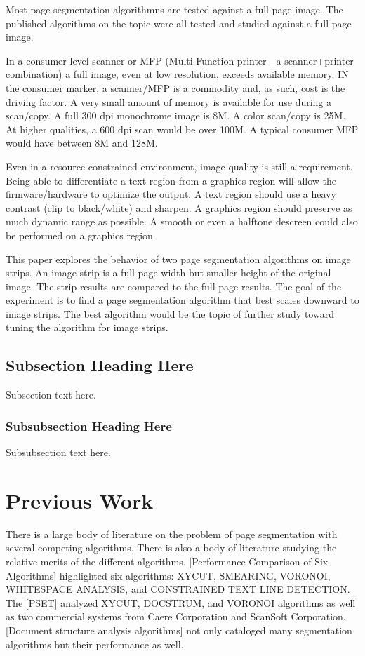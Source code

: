 \documentclass[conference]{IEEEtran}
\begin{document}
Most page segmentation algorithmns are tested against a full-page image. The
published algorithms on the topic were all tested and studied against a full-page
image.

In a consumer level scanner or MFP (Multi-Function printer—a scanner+printer
combination) a full image, even at low resolution, exceeds available
memory. IN the consumer marker, a scanner/MFP is a commodity and, as such, cost
is the driving factor. A very small amount of memory is available for use
during a scan/copy. A full 300 dpi monochrome image is 8M. A color scan/copy is
25M. At higher qualities, a 600 dpi scan would be over 100M. A typical consumer
MFP would have between 8M and 128M. 

Even in a resource-constrained environment, image quality is still a
requirement. Being able to differentiate a text region from a graphics region
will allow the firmware/hardware to optimize the output. A text region should
use a heavy contrast (clip to black/white) and sharpen. A graphics region
should preserve as much dynamic range as possible. A smooth or even a halftone
descreen could also be performed on a graphics region.

This paper explores the behavior of two page segmentation algorithms on image
strips.  An image strip is a full-page width but smaller height of the original
image. The strip results are compared to the full-page results. The goal of the
experiment is to find a page segmentation algorithm that best scales downward
to image strips. The best algorithm would be the topic of further study toward
tuning the algorithm for image strips.


\subsection{Subsection Heading Here}
Subsection text here.


\subsubsection{Subsubsection Heading Here}
Subsubsection text here.

\section{Previous Work}
There is a large body of literature on the problem of page segmentation with
several competing algorithms. There is also a body of literature studying the
relative merits of the different algorithms. [Performance Comparison of Six
Algorithms] highlighted six algorithms: XYCUT, SMEARING, VORONOI, WHITESPACE
ANALYSIS, and CONSTRAINED TEXT LINE DETECTION. The [PSET] analyzed XYCUT,
DOCSTRUM, and VORONOI algorithms as well as two commercial systems from
Caere Corporation and ScanSoft Corporation. [Document structure analysis
algorithms] not only cataloged many segmentation algorithms but their
performance as well.
\end{document}
